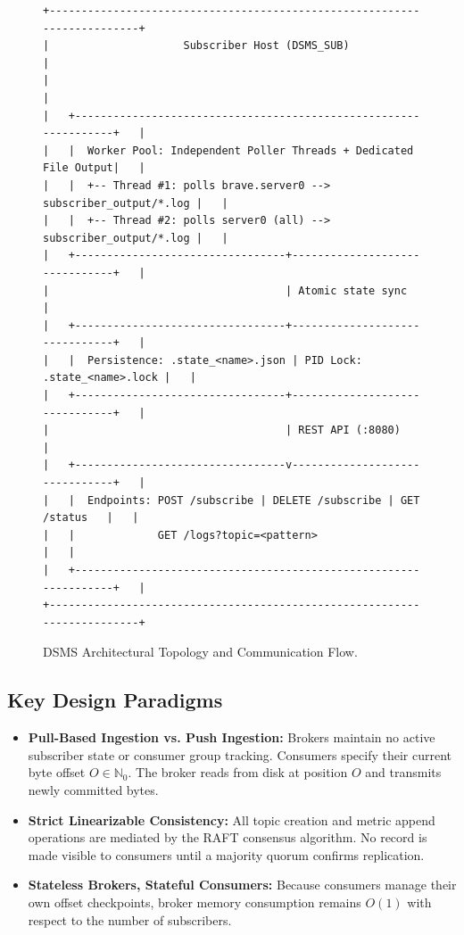 \documentclass[11pt,a4paper]{article}
\begin{document}
\begin{figure}[H]
\begin{verbatim}
+-------------------------------------------------------------------------+
|                     Subscriber Host (DSMS_SUB)                          |
|                                                                         |
|   +-----------------------------------------------------------------+   |
|   |  Worker Pool: Independent Poller Threads + Dedicated File Output|   |
|   |  +-- Thread #1: polls brave.server0 --> subscriber_output/*.log |   |
|   |  +-- Thread #2: polls server0 (all) --> subscriber_output/*.log |   |
|   +---------------------------------+-------------------------------+   |
|                                     | Atomic state sync                 |
|   +---------------------------------+-------------------------------+   |
|   |  Persistence: .state_<name>.json | PID Lock: .state_<name>.lock |   |
|   +---------------------------------+-------------------------------+   |
|                                     | REST API (:8080)                  |
|   +---------------------------------v-------------------------------+   |
|   |  Endpoints: POST /subscribe | DELETE /subscribe | GET /status   |   |
|   |             GET /logs?topic=<pattern>                           |   |
|   +-----------------------------------------------------------------+   |
+-------------------------------------------------------------------------+
\end{verbatim}
\caption{DSMS Architectural Topology and Communication Flow.}
\label{fig:architecture}
\end{figure}

\subsection{Key Design Paradigms}
\begin{itemize}[leftmargin=*]
    \item \textbf{Pull-Based Ingestion vs. Push Ingestion:} Brokers maintain no active subscriber state or consumer group tracking. Consumers specify their current byte offset $O \in \mathbb{N}_0$. The broker reads from disk at position $O$ and transmits newly committed bytes.
    \item \textbf{Strict Linearizable Consistency:} All topic creation and metric append operations are mediated by the RAFT consensus algorithm. No record is made visible to consumers until a majority quorum confirms replication.
    \item \textbf{Stateless Brokers, Stateful Consumers:} Because consumers manage their own offset checkpoints, broker memory consumption remains $O(1)$ with respect to the number of subscribers.
\end{itemize}
\end{document}
